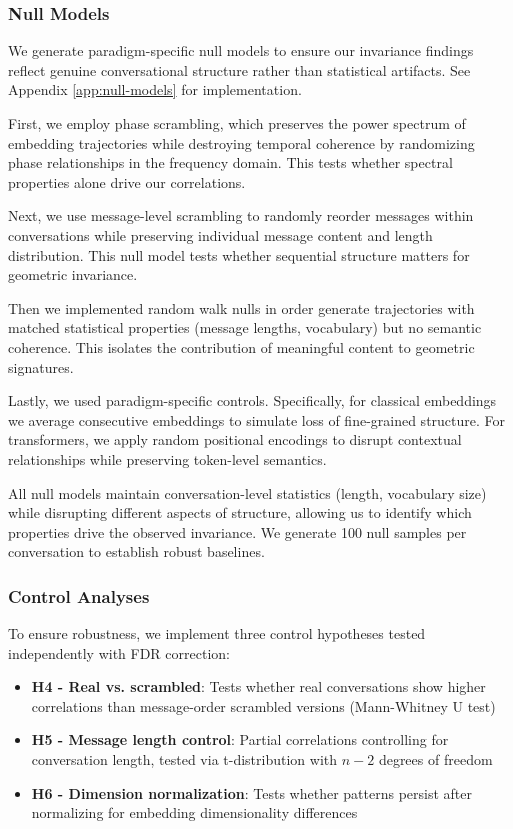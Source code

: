 \documentclass[11pt,letterpaper]{article}
\begin{document}
\subsubsection{Null Models}

We generate paradigm-specific null models to ensure our invariance findings reflect genuine conversational structure rather than statistical artifacts. See Appendix \ref{app:null-models} for implementation.

First, we employ phase scrambling, which preserves the power spectrum of embedding trajectories while destroying temporal coherence by randomizing phase relationships in the frequency domain. This tests whether spectral properties alone drive our correlations. 

Next, we use message-level scrambling to randomly reorder messages within conversations while preserving individual message content and length distribution. This null model tests whether sequential structure matters for geometric invariance.

Then we implemented random walk nulls in order generate trajectories with matched statistical properties (message lengths, vocabulary) but no semantic coherence. This isolates the contribution of meaningful content to geometric signatures.

Lastly, we used paradigm-specific controls. Specifically, for classical embeddings we average consecutive embeddings to simulate loss of fine-grained structure. For transformers, we apply random positional encodings to disrupt contextual relationships while preserving token-level semantics.

All null models maintain conversation-level statistics (length, vocabulary size) while disrupting different aspects of structure, allowing us to identify which properties drive the observed invariance. We generate 100 null samples per conversation to establish robust baselines.
\subsubsection{Control Analyses}

To ensure robustness, we implement three control hypotheses tested independently with FDR correction:

\begin{itemize}
\item \textbf{H4 - Real vs. scrambled}: Tests whether real conversations show higher correlations than message-order scrambled versions (Mann-Whitney U test)
\item \textbf{H5 - Message length control}: Partial correlations controlling for conversation length, tested via t-distribution with $n-2$ degrees of freedom
\item \textbf{H6 - Dimension normalization}: Tests whether patterns persist after normalizing for embedding dimensionality differences
\end{itemize}
\end{document}
